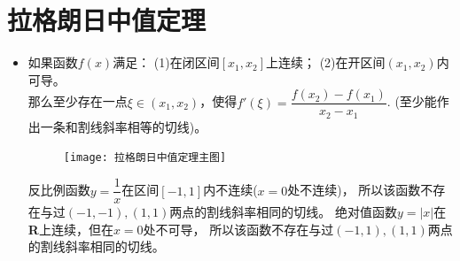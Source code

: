 \section{拉格朗日中值定理}
\begin{itemize}[leftmargin=\inteval{\myitemleftmargin}pt,itemsep=
   \inteval{\myitemitempsep}pt,topsep=\inteval{\myitemtopsep}pt]

\item 如果函数$ f(x) $满足：
(1)在闭区间$ [x_1,x_2] $上连续；
(2)在开区间$ (x_1,x_2) $内可导。\\
那么至少存在一点$ \xi\in(x_1,x_2) $，使得$ f'(\xi)=\dfrac{f(x_2)-f(x_1)}{x_2-x_1} $.
(至少能作出一条和割线斜率相等的切线)。 
\begin{figure}[h]
    \centering
    \texttt{[image: 拉格朗日中值定理主图]}
\end{figure}

反比例函数$ y=\dfrac{1}{x} $在区间$ [-1,1] $内不连续($ x=0 $处不连续)，
所以该函数不存在与过$ (-1,-1),(1,1) $两点的割线斜率相同的切线。
绝对值函数$ y=|x| $在\textbf{R}上连续，但在$ x=0 $处不可导，
所以该函数不存在与过$ (-1,1),(1,1) $两点的割线斜率相同的切线。


\end{itemize}
